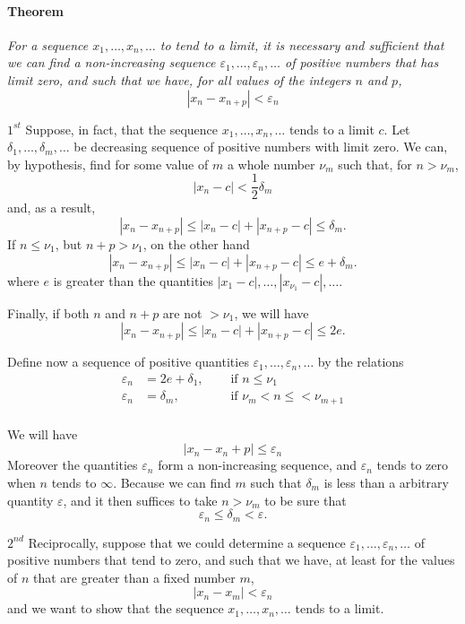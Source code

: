 \documentclass[10pt,letterpaper]{book}
\renewcommand\epsilon{\varepsilon}
\theoremstyle{definition}
\begin{document}
\paragraph{Theorem} \textit{
For a sequence $x_1,\dots,x_n,\dots$ to tend to a limit, it is necessary and sufficient that we can find a non-increasing sequence $\epsilon_1,\dots,\epsilon_n,\dots$ of positive numbers that has limit zero, and such that we have, for all values of the integers $n$ and $p$,
\[
  |x_n-x_{n+p}|<\epsilon_n
\]
}

\newcommand{\jseq}[2]{{#1}, \dots, {#2}, \dots}
$1^{st}$ Suppose, in fact, that the sequence $\jseq{x_1}{x_n}$ tends to a limit $c$. Let $\jseq{\delta_1}{\delta_m}$ be decreasing sequence of positive numbers with limit zero. We can, by hypothesis, find for some value of $m$ a whole number $\nu_m$ such that, for $n>\nu_m$,
\[
  |x_n-c|<\frac 1 2 \delta_m
\]
and, as a result,
\[
  |x_n-x_{n+p}| \leq |x_n - c| + |x_{n+p}-c|\leq\delta_m.
\]
If $n\leq \nu_1$, but $n+p>\nu_1$, on the other hand
\[
  |x_n-x_{n+p}| \leq |x_n - c| + |x_{n+p}-c|\leq e+\delta_m.
\]
where $e$ is greater than the quantities $\jseq{|x_1-c|}{|x_{\nu_1}-c|}$.


Finally, if both $n$ and $n+p$ are not $>\nu_1$, we will have
\[
  |x_n-x_{n+p}| \leq |x_n - c| + |x_{n+p}-c|\leq 2e.
\]

Define now a sequence of positive quantities $\jseq{\epsilon_1}{\epsilon_n}$ by the relations
\begin{align*}
  \epsilon_n &= 2e+\delta_1,\quad&\mbox{ if }n\leq \nu_1\\
  \epsilon_n &= \delta_m,\quad&\mbox{ if }\nu_m<n\leq<\nu_{m+1}\\
\end{align*}

We will have
\[
  |x_n-x_n+p|\leq \epsilon_n
\]
Moreover the quantities $\epsilon_n$ form a non-increasing sequence, and $\epsilon_n$ tends to zero when $n$ tends to $\infty$. Because we can find $m$ such that $\delta_m$ is less than a arbitrary quantity $\epsilon$, and it then suffices to take $n>\nu_m$ to be sure that
\[
  \epsilon_n\leq \delta_m<\epsilon.
\]

$2^{nd}$ Reciprocally, suppose that we could determine a sequence  $\jseq{\epsilon_1}{\epsilon_n}$ of positive numbers that tend to zero, and such that we have, at least for the values of $n$ that are greater than a fixed number $m$,
\begin{equation}\label{eqn:1}
  |x_n-x_m|<\epsilon_n
\end{equation}
and we want to show that the sequence $\jseq{x_1}{x_n}$ tends to a limit.
\end{document}
